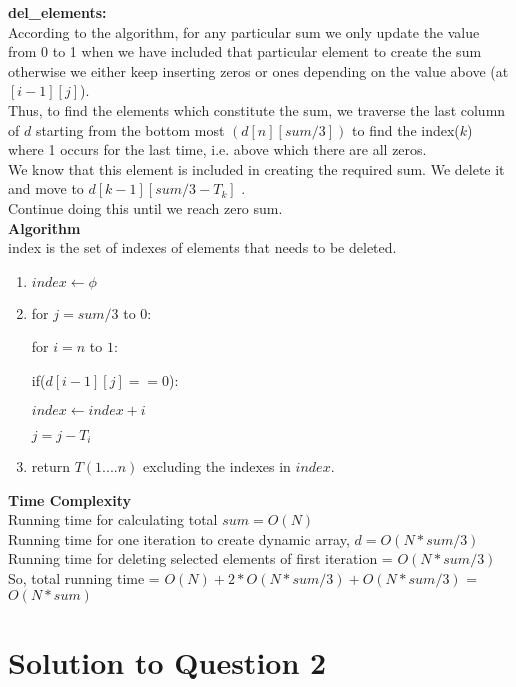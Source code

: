 \documentclass[11pt]{article}
\begin{document}
\textbf{del\_elements:} \\
According to the algorithm, for any particular sum we only update the value from 0 to 1 when we have included that particular element
to create the sum otherwise we either keep inserting zeros or ones depending on the value above (at $[i-1][j]$).\\
Thus, to find the elements which constitute the sum, we traverse the last column of $d$ starting from the bottom most $(d[n][sum/3])$
to find the index($k$) where 1 occurs for the last time, i.e. above which there are all zeros. \\
We know that this element is included in creating the required sum. We delete it and move to $d[k-1][sum/3 - T_k]$ .\\
Continue doing this until we reach zero sum. \\
\textbf{Algorithm} \\
index is the set of indexes of elements that needs to be deleted. \\
\begin{enumerate}
	\item $index \leftarrow \phi$
	\item for $j = sum/3$ to $0$:
	
	\hspace{5mm} for $i = n$ to $1$:
	
	\hspace{10mm} 	if($d[i-1][j] == 0$):
	
	\hspace{15mm} 		$index \leftarrow index + i$
	
	\hspace{15mm} 		$j = j - T_i$
	\item return $T(1....n)$ excluding the indexes in $index$.
\end{enumerate}

\textbf{Time Complexity} \\
Running time for calculating total $sum = O(N)$ \\
Running time for one iteration to create dynamic array, $d = O(N*sum/3)$ \\
Running time for deleting selected elements of first iteration = $O(N*sum/3)$ \\
So, total running time = $O(N) + 2*O(N*sum/3) + O(N*sum/3)$ = $O(N*sum)$

\newpage
\section{Solution to Question 2}
\end{document}
